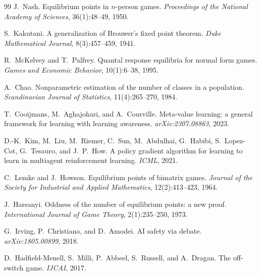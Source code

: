 \documentclass[11pt,a4paper]{article}
\begin{document}
\begin{thebibliography}{99}
J.~Nash.
\newblock Equilibrium points in $n$-person games.
\newblock \emph{Proceedings of the National Academy of Sciences}, 36(1):48--49, 1950.

S.~Kakutani.
\newblock A generalization of Brouwer's fixed point theorem.
\newblock \emph{Duke Mathematical Journal}, 8(3):457--459, 1941.

R.~McKelvey and T.~Palfrey.
\newblock Quantal response equilibria for normal form games.
\newblock \emph{Games and Economic Behavior}, 10(1):6--38, 1995.

A.~Chao.
\newblock Nonparametric estimation of the number of classes in a population.
\newblock \emph{Scandinavian Journal of Statistics}, 11(4):265--270, 1984.

T.~Cooijmans, M.~Aghajohari, and A.~Courville.
\newblock Meta-value learning: a general framework for learning with
learning awareness.
\newblock \emph{arXiv:2307.08863}, 2023.

D.-K.~Kim, M.~Liu, M.~Riemer, C.~Sun, M.~Abdulhai, G.~Habibi,
S.~Lopez-Cot, G.~Tesauro, and J.~P.~How.
\newblock A policy gradient algorithm for learning to learn in multiagent
reinforcement learning.
\newblock \emph{ICML}, 2021.

C.~Lemke and J.~Howson.
\newblock Equilibrium points of bimatrix games.
\newblock \emph{Journal of the Society for Industrial and Applied Mathematics},
12(2):413--423, 1964.

J.~Harsanyi.
\newblock Oddness of the number of equilibrium points: a new proof.
\newblock \emph{International Journal of Game Theory}, 2(1):235--250, 1973.

G.~Irving, P.~Christiano, and D.~Amodei.
\newblock AI safety via debate.
\newblock \emph{arXiv:1805.00899}, 2018.

D.~Hadfield-Menell, S.~Milli, P.~Abbeel, S.~Russell, and A.~Dragan.
\newblock The off-switch game.
\newblock \emph{IJCAI}, 2017.

\end{thebibliography}
\end{document}
